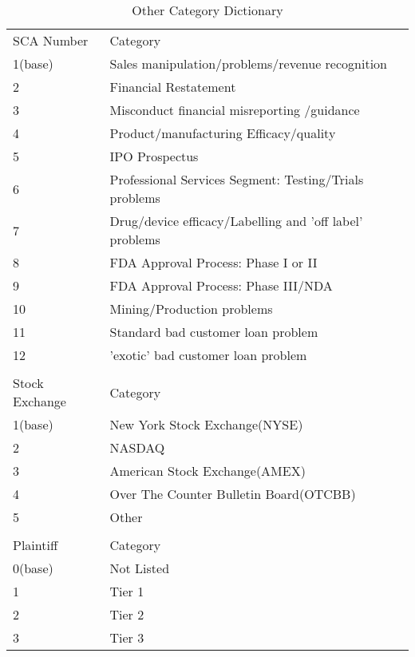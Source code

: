 \footnotesize
\begin{table}[H]
\footnotesize
\centering
\caption{Other Category Dictionary}
\label{other}
\begin{tabular}{ll}
SCA Number     & Category                                                \\
1(base)        & Sales manipulation/problems/revenue recognition         \\
2              & Financial Restatement                                   \\
3              & Misconduct financial misreporting /guidance             \\
4              & Product/manufacturing Efficacy/quality                  \\
5              & IPO Prospectus                                          \\
6              & Professional Services Segment: Testing/Trials problems  \\
7              & Drug/device efficacy/Labelling and 'off label' problems \\
8              & FDA Approval Process: Phase I or II                     \\
9              & FDA Approval Process: Phase III/NDA                     \\
10             & Mining/Production problems                              \\
11             & Standard bad customer loan problem                      \\
12             & 'exotic' bad customer loan problem                      \\
               &                                                         \\
Stock Exchange & Category                                                \\
1(base)        & New York Stock Exchange(NYSE)                           \\
2              & NASDAQ                                                  \\
3              & American Stock Exchange(AMEX)                           \\
4              & Over The Counter Bulletin Board(OTCBB)                  \\
5              & Other                                                   \\
               &                                                         \\
Plaintiff      & Category                                                \\
0(base)        & Not Listed                                              \\
1              & Tier 1                                                  \\
2              & Tier 2                                                  \\
3              & Tier 3                                                 
\end{tabular}
\end{table}


